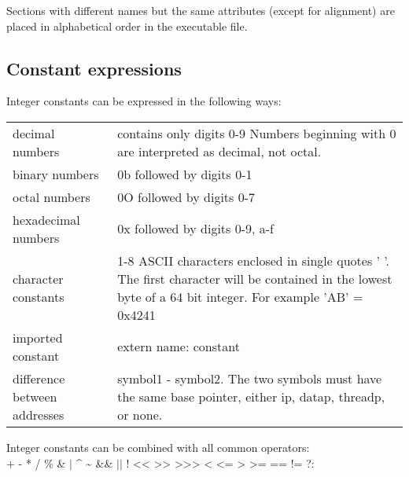 \documentclass[forwardcom.tex]{subfiles}
\begin{document}
Sections with different names but the same attributes (except for alignment) are placed in alphabetical order in the executable file.
\vspace{2mm}


\subsection{Constant expressions} \label{assemblyConstantExpressions}
Integer constants can be expressed in the following ways:

\begin{tabular}{|p{47mm}p{115mm}|}
\hline
decimal numbers & contains only digits 0-9 \newline Numbers beginning with 0 are interpreted as decimal, not octal. \\
binary numbers & 0b followed by digits 0-1\\
octal numbers & 0O followed by digits 0-7\\
hexadecimal numbers & 0x followed by digits 0-9, a-f\\
character constants & 1-8 ASCII characters enclosed in single quotes '{ }'. The first character will be contained in the lowest byte of a 64 bit integer. For example 'AB' = 0x4241 \\
imported constant & extern name: constant \\
difference between addresses & symbol1 - symbol2. The two symbols must have the same base pointer, either ip, datap, threadp, or none. \\
\hline
\end{tabular}
\vspace{2mm}

Integer constants can be combined with all common operators: \\
+ \hspace{2mm} - \hspace{2mm} * \hspace{2mm} / \hspace{2mm} \% \hspace{2mm} \& \hspace{2mm} $\vert$ \hspace{2mm} \^{} \hspace{2mm} \textasciitilde \hspace{2mm}
 \&\& \hspace{2mm} $\vert\vert$ \hspace{2mm} ! \hspace{2mm}
\textless\textless \hspace{2mm} \textgreater\textgreater \hspace{2mm} 
\textgreater\textgreater\textgreater \hspace{2mm} 
\textless \hspace{2mm} \textless= \hspace{2mm} \textgreater \hspace{2mm} \textgreater= \hspace{2mm} 
 == \hspace{2mm} != \hspace{2mm} ?: 
\vspace{2mm}
\end{document}
